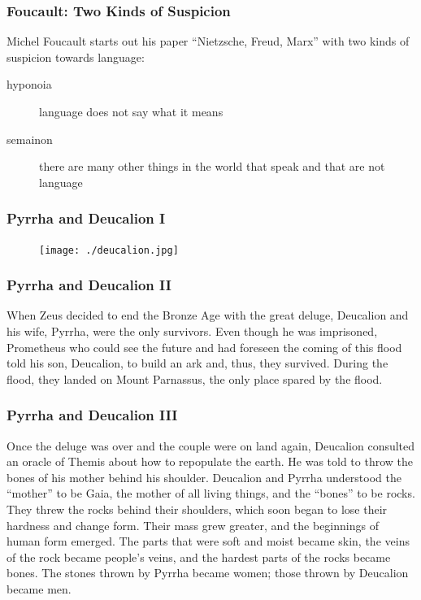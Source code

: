 \documentclass[xcolor=dvipsnames]{beamer}
\begin{document}
\begin{frame}
  \frametitle{Foucault: Two Kinds of Suspicion}
  Michel Foucault starts out his paper ``Nietzsche, Freud, Marx'' with
  two kinds of suspicion towards language:
  \begin{description}
  \item[hyponoia] language does not say what it means
  \item[semainon] there are many other things in the world that speak and that are not language
  \end{description}
\end{frame}

\begin{frame}
  \frametitle{Pyrrha and Deucalion I}
      \begin{figure}[h]
    \texttt{[image: ./deucalion.jpg]}
  \end{figure}
\end{frame}

\begin{frame}
  \frametitle{Pyrrha and Deucalion II}
  When Zeus decided to end the Bronze Age with the great deluge,
  Deucalion and his wife, Pyrrha, were the only survivors. Even though
  he was imprisoned, Prometheus who could see the future and had
  foreseen the coming of this flood told his son, Deucalion, to build
  an ark and, thus, they survived. During the flood, they landed on
  Mount Parnassus, the only place spared by the flood.
\end{frame}

\begin{frame}
  \frametitle{Pyrrha and Deucalion III}
  Once the deluge was over and the couple were on land again,
  Deucalion consulted an oracle of Themis about how to repopulate the
  earth. He was told to throw the bones of his mother behind his
  shoulder. Deucalion and Pyrrha understood the ``mother'' to be Gaia,
  the mother of all living things, and the ``bones'' to be rocks. They
  threw the rocks behind their shoulders, which soon began to lose
  their hardness and change form. Their mass grew greater, and the
  beginnings of human form emerged. The parts that were soft and moist
  became skin, the veins of the rock became people's veins, and the
  hardest parts of the rocks became bones. The stones thrown by Pyrrha
  became women; those thrown by Deucalion became men.
\end{frame}
\end{document}
